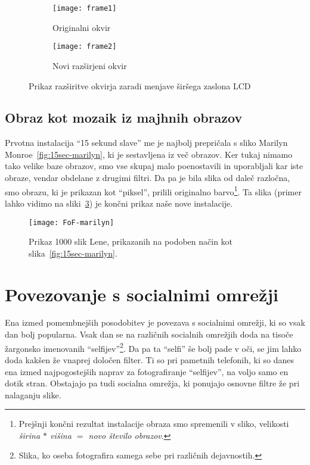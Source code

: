 \begin{figure}[!ht]
    \centering
    \begin{subfigure}[b]{0.33\textwidth}
        \texttt{[image: frame1]}
        \caption{Originalni okvir}
    \end{subfigure}
    \begin{subfigure}[b]{0.6\textwidth}
        \texttt{[image: frame2]}
        \caption{Novi razširjeni okvir}
        \label{fig:frame2}
    \end{subfigure}
    \caption{Prikaz razširitve okvirja zaradi menjave širšega zaslona LCD}
\end{figure}


\section{Obraz kot mozaik iz majhnih obrazov}
Prvotna instalacija ``15 sekund slave'' me je najbolj prepričala s sliko
Marilyn Monroe~\ref{fig:15sec-marilyn}, ki je sestavljena iz več obrazov. Ker
tukaj nimamo tako velike baze obrazov, smo vse skupaj malo poenostavili in
uporabljali kar iste obraze, vendar obdelane z drugimi filtri. Da pa je bila
slika od daleč razločna, smo obrazu, ki je prikazan kot ``piksel'', prilili
originalno barvo\footnote{Prejšnji končni rezultat instalacije obraza smo
spremenili v sliko, velikosti \textit{širina $*$ višina $=$ novo število
obrazov}.}. Ta slika (primer lahko vidimo na sliki~\ref{fig:FoF-marilyn}) je
končni prikaz naše nove instalacije.

\begin{figure}[!ht]
    \centering
    \texttt{[image: FoF-marilyn]}
    \caption{Prikaz 1000 slik Lene, prikazanih na podoben način kot slika~\ref{fig:15sec-marilyn}.}
    \label{fig:FoF-marilyn}
\end{figure}


\chapter{Povezovanje s socialnimi omrežji}
\label{ch:socialNetwork}
Ena izmed pomembnejših posodobitev je povezava s socialnimi omrežji, ki so
vsak dan bolj popularna. Vsak dan se na različnih socialnih omrežjih doda na
tisoče žargonsko imenovanih ``selfijev''\footnote{Slika, ko oseba fotografira
samega sebe pri različnih dejavnostih.}. Da pa ta ``selfi'' še bolj pade v
oči, se jim lahko doda kakšen že vnaprej določen filter. Ti so pri pametnih
telefonih, ki so danes ena izmed najpogostejših naprav za fotografiranje
``selfijev'', na voljo samo en dotik stran. Obstajajo pa tudi socialna
omrežja, ki ponujajo osnovne filtre že pri nalaganju slike.


